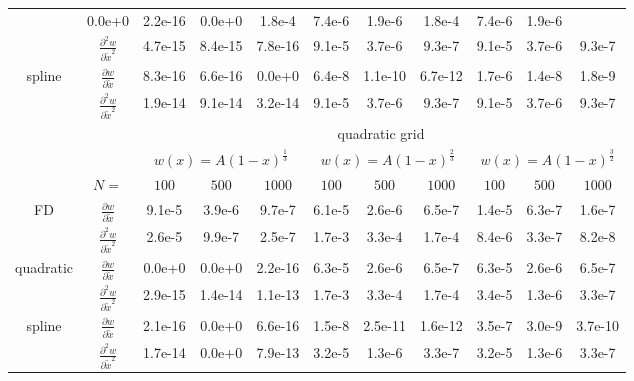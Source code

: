 \begin{tabular}{cc|c|c|c|c|c|c|c|c|c|}
  &0.0e+0  &2.2e-16  &0.0e+0  &1.8e-4  &7.4e-6  &1.9e-6  &1.8e-4  &7.4e-6  &1.9e-6
\\ \cline{2-11}
\multicolumn{1}{|c|}{}                        &
\multicolumn{1}{|c|}{$\frac{\partial^2 w}{\partial \tilde x^2}$}
  &4.7e-15  &8.4e-15  &7.8e-16  &9.1e-5  &3.7e-6  &9.3e-7  &9.1e-5  &3.7e-6  &9.3e-7
\\ \cline{1-11}
\multicolumn{1}{|c|}{\multirow{2}{*}{spline}} &
\multicolumn{1}{|c|}{$\frac{\partial w}{\partial \tilde x}$}
  &8.3e-16  &6.6e-16  &0.0e+0  &6.4e-8  &1.1e-10  &6.7e-12  &1.7e-6  &1.4e-8  &1.8e-9
\\ \cline{2-11}
\multicolumn{1}{|c|}{}                        &
\multicolumn{1}{|c|}{$\frac{\partial^2 w}{\partial \tilde x^2}$}
  &1.9e-14  &9.1e-14  &3.2e-14  &9.1e-5  &3.7e-6  &9.3e-7  &9.1e-5  &3.7e-6  &9.3e-7
\\ \cline{1-11}
& & \multicolumn{9}{|c|}{quadratic grid}
\\ \cline{3-11}
& & \multicolumn{3}{|c|}{$w(x)=A(1-x)^\frac{1}{3}$} &  \multicolumn{3}{|c|}{$w(x)=A(1-x)^\frac{2}{3}$} &  \multicolumn{3}{|c|}{$w(x)=A(1-x)^\frac{3}{2}$}
\\ \cline{2-11}
& \multicolumn{1}{|c|}{$N=$} & $100$ & $500$ & $1000$ & $100$ & $500$ & $1000$ & $100$ & $500$ & $1000$
\\ \cline{1-11}
\multicolumn{1}{|c|}{\multirow{2}{*}{FD}} &
\multicolumn{1}{|c|}{$\frac{\partial w}{\partial \tilde x}$}
  &9.1e-5  &3.9e-6  &9.7e-7  &6.1e-5  &2.6e-6  &6.5e-7  &1.4e-5  &6.3e-7  &1.6e-7
\\ \cline{2-11}
\multicolumn{1}{|c|}{}                        &
\multicolumn{1}{|c|}{$\frac{\partial^2 w}{\partial \tilde x^2}$}
  &2.6e-5  &9.9e-7  &2.5e-7  &1.7e-3  &3.3e-4  &1.7e-4  &8.4e-6  &3.3e-7  &8.2e-8
\\ \cline{1-11}
\multicolumn{1}{|c|}{\multirow{2}{*}{quadratic}} &
\multicolumn{1}{|c|}{$\frac{\partial w}{\partial \tilde x}$}
  &0.0e+0  &0.0e+0  &2.2e-16  &6.3e-5  &2.6e-6  &6.5e-7  &6.3e-5  &2.6e-6  &6.5e-7
\\ \cline{2-11}
\multicolumn{1}{|c|}{}                        &
\multicolumn{1}{|c|}{$\frac{\partial^2 w}{\partial \tilde x^2}$}
  &2.9e-15  &1.4e-14  &1.1e-13  &1.7e-3  &3.3e-4  &1.7e-4  &3.4e-5  &1.3e-6  &3.3e-7
\\ \cline{1-11}
\multicolumn{1}{|c|}{\multirow{2}{*}{spline}} &
\multicolumn{1}{|c|}{$\frac{\partial w}{\partial \tilde x}$}
  &2.1e-16  &0.0e+0  &6.6e-16  &1.5e-8  &2.5e-11  &1.6e-12  &3.5e-7  &3.0e-9  &3.7e-10
\\ \cline{2-11}
\multicolumn{1}{|c|}{}                        &
\multicolumn{1}{|c|}{$\frac{\partial^2 w}{\partial \tilde x^2}$}
  &1.7e-14  &0.0e+0  &7.9e-13  &3.2e-5  &1.3e-6  &3.3e-7  &3.2e-5  &1.3e-6  &3.3e-7
\\ \cline{1-11}
\end{tabular}
